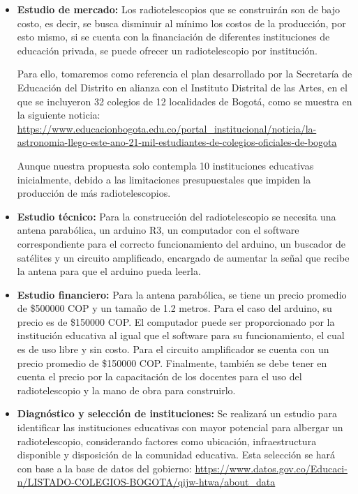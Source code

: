 \begin{itemize}

\item \textbf{Estudio de mercado:} Los radiotelescopios que se construirán
son de bajo costo, es decir, se busca disminuir al mínimo los costos de la
producción, por esto mismo, si se cuenta con la financiación de diferentes
instituciones de educación privada, se puede ofrecer un radiotelescopio por
institución. 

Para ello, tomaremos como referencia el plan desarrollado por la Secretaría de 
Educación del Distrito en alianza con el Instituto Distrital de las Artes, en 
el que se incluyeron 32 colegios de 12 localidades de Bogotá, como se muestra 
en la siguiente noticia:
\url{https://www.educacionbogota.edu.co/portal_institucional/noticia/la-
astronomia-llego-este-ano-21-mil-estudiantes-de-colegios-oficiales-de-bogota}

Aunque nuestra propuesta solo contempla 10 instituciones educativas
inicialmente, debido a las limitaciones presupuestales que impiden la 
producción de más radiotelescopios.

\item \textbf{Estudio técnico:} Para la construcción del radiotelescopio se
necesita una antena parabólica, un arduino R3, un computador con el software
correspondiente para el correcto funcionamiento del arduino, un buscador de
satélites y un circuito amplificado, encargado de aumentar la señal que recibe
la antena para que el arduino pueda leerla.

\item \textbf{Estudio financiero:} Para la antena parabólica, se tiene un precio
promedio de \$500000 COP y un tamaño de 1.2 metros. Para el caso del arduino, su
precio es de \$150000 COP. El computador puede ser proporcionado por la
institución educativa al igual que el software para su funcionamiento, el cual
es de uso libre y sin costo. Para el circuito amplificador se cuenta con un
precio promedio de \$150000 COP. Finalmente, también se debe tener en cuenta el
precio por la capacitación de los docentes para el uso del radiotelescopio y la
mano de obra para construirlo.

\item \textbf{Diagnóstico y selección de instituciones:} Se realizará un estudio
para identificar las instituciones educativas con mayor potencial para albergar
un radiotelescopio, considerando factores como ubicación, infraestructura
disponible y disposición de la comunidad educativa. Esta selección se hará con
base a la base de datos del gobierno:
\url{https://www.datos.gov.co/Educaci-n/LISTADO-COLEGIOS-BOGOTA/qijw-htwa/about_data}


\end{itemize}
